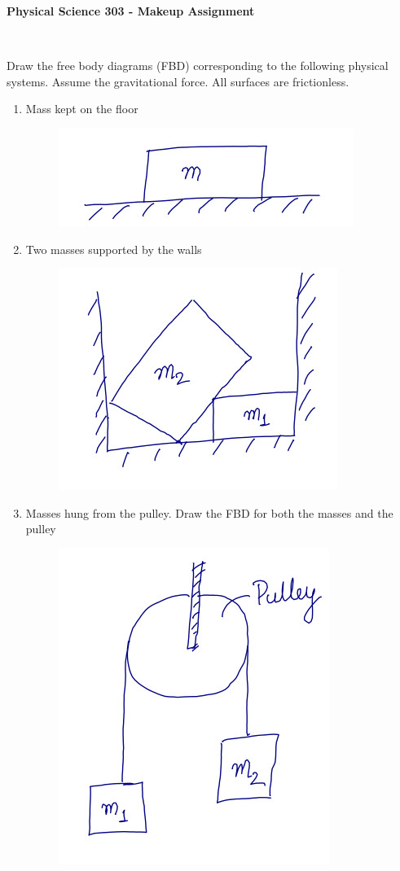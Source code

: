 \documentclass[10pt]{article}
\date{2014-6-22}
\begin{document}
\begin{center}
\begin{Large}\textbf{Physical Science 303 - Makeup Assignment}\end{Large} \\
\smallskip
\end{center}
Draw the free body diagrams (FBD) corresponding to the following physical systems.  Assume the gravitational force.  All surfaces are frictionless.
 \begin{enumerate}
\item Mass kept on the floor
\begin{figure}[h]
\includegraphics[scale=.5]{fbdmass}
\centering
\end{figure}

\item Two masses supported by the walls
\begin{figure}[h]
\includegraphics[scale=.5]{fbdmass2}
\centering
\end{figure}

\item Masses hung from the pulley.  Draw the FBD for both the masses and the pulley
\begin{figure}[h]
\includegraphics[scale=.5]{fbdpulley}
\centering
\end{figure}
\end{enumerate}
\end{document}

